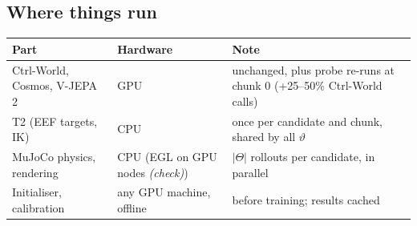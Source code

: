 \documentclass[11pt,a4paper]{article}
\newcommand{\chk}{\textit{(check)}}
\begin{document}
\subsection{Where things run}
\begin{center}\small
\begin{tabularx}{\linewidth}{@{}>{\raggedright\arraybackslash}p{4.2cm}>{\raggedright\arraybackslash}p{3.6cm}>{\raggedright\arraybackslash}X@{}}
\toprule
\textbf{Part} & \textbf{Hardware} & \textbf{Note}\\
\midrule
Ctrl-World, Cosmos, V-JEPA 2 & GPU & unchanged, plus probe re-runs at chunk 0 (+25--50\% Ctrl-World calls)\\
T2 (EEF targets, IK) & CPU & once per candidate and chunk, shared by all $\vartheta$\\
MuJoCo physics, rendering & CPU (EGL on GPU nodes \chk) & $|\Theta|$ rollouts per candidate, in parallel\\
Initialiser, calibration & any GPU machine, offline & before training; results cached\\
\bottomrule
\end{tabularx}
\end{center}

\end{document}

